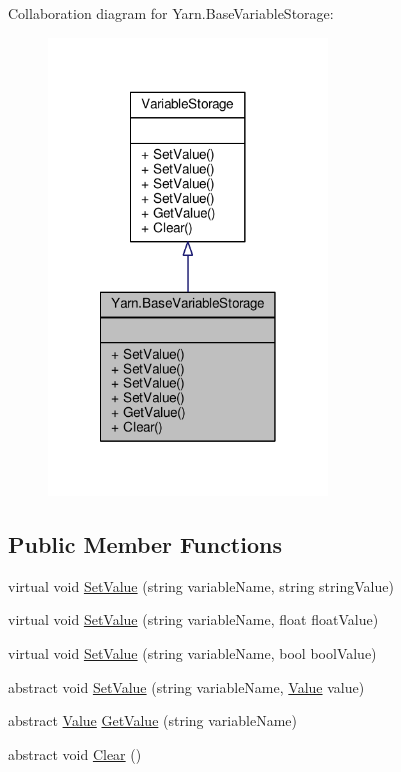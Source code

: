 Collaboration diagram for Yarn.\-Base\-Variable\-Storage\-:
\nopagebreak
\begin{figure}[H]
\begin{center}
\leavevmode
\includegraphics[width=210pt]{a00583}
\end{center}
\end{figure}
\subsection*{Public Member Functions}
\begin{DoxyCompactItemize}
\item 
virtual void \hyperlink{a00043_a5b4ab9cb87b92b0881cbad4a9a09f4b3}{Set\-Value} (string variable\-Name, string string\-Value)
\item 
virtual void \hyperlink{a00043_a05be55e20a0ba7614f5f2695359756de}{Set\-Value} (string variable\-Name, float float\-Value)
\item 
virtual void \hyperlink{a00043_aa65aa327c08a1ff3287ced01bb765271}{Set\-Value} (string variable\-Name, bool bool\-Value)
\item 
abstract void \hyperlink{a00043_a1c57d6d208b78abec0a670396771448e}{Set\-Value} (string variable\-Name, \hyperlink{a00167}{Value} value)
\item 
abstract \hyperlink{a00167}{Value} \hyperlink{a00043_a13b142df804d9842e97e628e252928e8}{Get\-Value} (string variable\-Name)
\item 
abstract void \hyperlink{a00043_a7e45c37f3662ce9f2643e306bb2b3adc}{Clear} ()
\end{DoxyCompactItemize}



